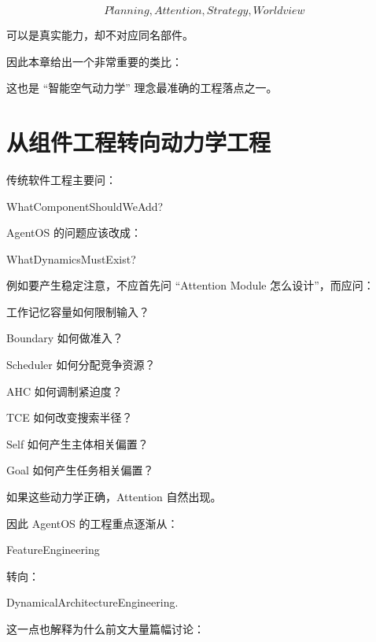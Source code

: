 \[
Planning,
Attention,
Strategy,
Worldview
\]

可以是真实能力，却不对应同名部件。

因此本章给出一个非常重要的类比：

\begin{statementbox}
\centering
{}
\end{statementbox}

这也是 ``智能空气动力学'' 理念最准确的工程落点之一。

\section{从组件工程转向动力学工程}

传统软件工程主要问：

\begin{statementbox}
WhatComponentShouldWeAdd?
\end{statementbox}

AgentOS 的问题应该改成：

\begin{statementbox}
WhatDynamicsMustExist?
\end{statementbox}

例如要产生稳定注意，不应首先问 ``Attention Module 怎么设计''，而应问：

工作记忆容量如何限制输入？

Boundary 如何做准入？

Scheduler 如何分配竞争资源？

AHC 如何调制紧迫度？

TCE 如何改变搜索半径？

Self 如何产生主体相关偏置？

Goal 如何产生任务相关偏置？

如果这些动力学正确，Attention 自然出现。

因此 AgentOS 的工程重点逐渐从：

\begin{statementbox}
FeatureEngineering
\end{statementbox}

转向：

\begin{statementbox}
DynamicalArchitectureEngineering.
\end{statementbox}

这一点也解释为什么前文大量篇幅讨论：

